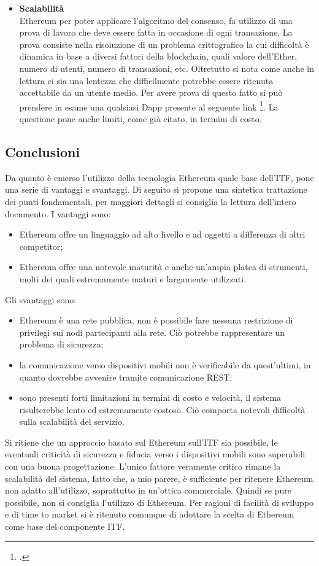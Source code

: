 \begin{itemize}
    \item \textbf{Scalabilità}\\
    Ethereum per poter applicare l’algoritmo del consenso, fa utilizzo di una prova di lavoro che deve essere fatta in occasione di ogni transazione. La prova consiste nella risoluzione di un problema crittografico la cui difficoltà è dinamica in base a diversi fattori della blockchain, quali valore dell’Ether, numero di utenti, numero di transazioni, etc. Oltretutto si nota come anche in lettura ci sia una lentezza che difficilmente potrebbe essere ritenuta accettabile da un utente medio. Per avere prova di questo fatto si può prendere in esame una qualsiasi Dapp presente al seguente link \footcite{site:state-dapps}. La questione pone anche limiti, come già citato, in termini di costo.
\end{itemize}
\subsection{Conclusioni}
Da quanto è emerso l’utilizzo della tecnologia Ethereum quale base dell’ITF, pone una serie di vantaggi e svantaggi. Di seguito si propone una sintetica trattazione dei punti fondamentali, per maggiori dettagli si consiglia la lettura dell’intero documento.
I vantaggi sono:
\begin{itemize}
    \item Ethereum offre un linguaggio ad alto livello e ad oggetti a differenza di altri competitor;
    \item Ethereum offre una notevole maturità e anche un’ampia platea di strumenti, molti dei quali estremamente maturi e largamente utilizzati.
\end{itemize}
    
Gli svantaggi sono: 
\begin{itemize}
    \item Ethereum è una rete pubblica, non è possibile fare nessuna restrizione di privilegi sui nodi partecipanti alla rete. Ciò potrebbe rappresentare un problema di sicurezza;
    \item la comunicazione verso dispositivi mobili non è verificabile da quest’ultimi, in quanto dovrebbe avvenire tramite comunicazione REST;
    \item sono presenti forti limitazioni in termini di costo e velocità, il sistema risulterebbe lento ed estremamente costoso. Ciò comporta notevoli difficoltà sulla scalabilità del servizio.
\end{itemize}
Si ritiene che un approccio basato sul Ethereum sull’ITF sia possibile, le eventuali criticità di sicurezza e fiducia verso i dispositivi mobili sono superabili con una buona progettazione. L’unico fattore veramente critico rimane la scalabilità del sistema, fatto che, a mio parere, è sufficiente per ritenere Ethereum non adatto all’utilizzo, soprattutto in un’ottica commerciale. Quindi se pure possibile, non si consiglia l’utilizzo di Ethereum. Per ragioni di facilità di sviluppo e di time to market si è ritenuto comunque di adottare la scelta di Ethereum come base del componente ITF.

